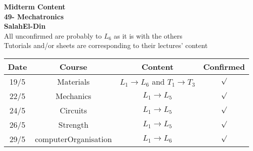 \documentclass[12pt]{article}
\begin{document}
\begin{center}
	\textbf{\LARGE Midterm Content
		\\
		\vspace{0.5cm}
		\Large 49- Mechatronics 
	}
	\\ 

\vspace{0.3cm}
\textbf{SalahEl-Din}
\\
\vspace{0.3cm}
All unconfirmed are probably to $L_6$ as it is with the others \\
Tutorials and/or sheets are corresponding to their lectures' content
\\
	\vspace{1cm}
\begin{tabular}{|c|c|c|c|}
	\hline
	Date&Course&Content&Confirmed\\
	\hline
	19/5 & Materials& $L_1 \to L_6$ and $ T_1 \to T_3$ & $\surd$ \\
	\hline
	22/5&Mechanics&$L_1 \to L_5$ & $\surd$ \\
	\hline
	24/5& Circuits&$L_1 \to L_5$ & $\surd$ \\
	\hline
	26/5&Strength& $L_1 \to L_5$& $\surd$\\
	\hline
	29/5&computerOrganisation& $L_1 \to L_6$ & $\surd$ \\
	\hline
\end{tabular}
\end{center}
\end{document}
